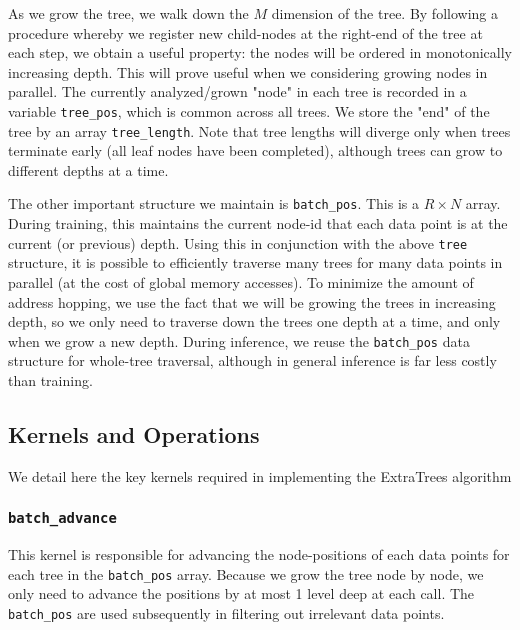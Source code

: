 \documentclass[10pt,conference]{IEEEtran}
\begin{document}
  As we grow the tree, we walk down the $M$ dimension of the tree. By following a procedure whereby we register new child-nodes at the right-end of the tree at each step, we obtain a useful property: the nodes will be ordered in monotonically increasing depth. This will prove useful when we considering growing nodes in parallel. The currently analyzed/grown "node" in each tree is recorded in a variable \texttt{tree\_pos}, which is common across all trees. We store the "end" of the tree by an array \texttt{tree\_length}. Note that tree lengths will diverge only when trees terminate early (all leaf nodes have been completed), although trees can grow to different depths at a time.
  
  The other important structure we maintain is \texttt{batch\_pos}. This is a $R \times N$ array. During training, this maintains the current node-id that each data point is at the current (or previous) depth. Using this in conjunction with the above \texttt{tree} structure, it is possible to efficiently traverse many trees for many data points in parallel (at the cost of global memory accesses). To minimize the amount of address hopping, we use the fact that we will be growing the trees in increasing depth, so we only need to traverse down the trees one depth at a time, and only when we grow a new depth. During inference, we reuse the \texttt{batch\_pos} data structure for whole-tree traversal, although in general inference is far less costly than training.
    
  \subsection{Kernels and Operations}
    We detail here the key kernels required in implementing the ExtraTrees algorithm
  
  \subsubsection{\texttt{batch\_advance}}
    This kernel is responsible for advancing the node-positions of each data points for each tree in the \texttt{batch\_pos} array. Because we grow the tree node by node, we only need to advance the positions by at most 1 level deep at each call. The \texttt{batch\_pos} are used subsequently in filtering out irrelevant data points.
   
\end{document}
